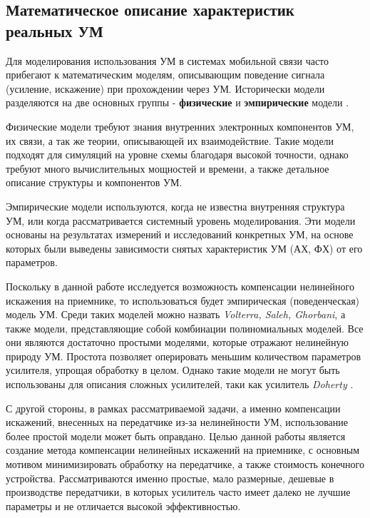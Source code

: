 \subsection{Математическое описание характеристик реальных УМ}

Для моделирования использования УМ в системах мобильной связи часто прибегают к
математическим моделям, описывающим поведение сигнала (усиление, искажение) при 
прохождении через УМ. Исторически модели разделяются на две основных
группы - \textbf{физические} и \textbf{эмпирические} модели \cite{cambridge2008}.

Физические модели требуют знания внутренних электронных компонентов УМ, их
связи, а так же теории, описывающей их взаимодействие. Такие модели подходят
для симуляций на уровне схемы благодаря высокой точности, однако требуют
много вычислительных мощностей и времени, а также детальное описание
структуры и компонентов УМ.

Эмпирические модели используются, когда не известна внутренняя структура УМ,
или когда рассматривается системный уровень моделирования. Эти модели
основаны на результатах измерений и исследований конкретных УМ, на основе
которых были выведены зависимости снятых характеристик УМ (АХ, ФХ) от его
параметров.

Поскольку в данной работе исследуется возможность компенсации нелинейного
искажения на приемнике, то использоваться будет эмпирическая
(поведенческая) модель УМ. Среди таких моделей можно назвать
\textit{Volterra, Saleh, Ghorbani}, а также модели, представляющие собой комбинации
полиномиальных моделей. Все они являются достаточно простыми моделями,
которые отражают нелинейную природу УМ. Простота позволяет оперировать
меньшим количеством параметров усилителя, упрощая обработку в целом. Однако
такие модели не могут быть использованы для описания сложных усилителей,
таки как усилитель \textit{Doherty} \cite{Doherty1936}\cite{3gpp.38.803}.

С другой стороны, в рамках рассматриваемой задачи, а именно компенсации
искажений, внесенных на передатчике из-за нелинейности УМ, использование
более простой модели может быть оправдано. Целью данной работы является
создание метода компенсации нелинейных искажений на приемнике, с основным
мотивом минимизировать обработку на передатчике, а также стоимость
конечного устройства. Рассматриваются именно простые, мало размерные,
дешевые в производстве передатчики, в которых усилитель часто имеет далеко
не лучшие параметры и не отличается высокой эффективностью.

